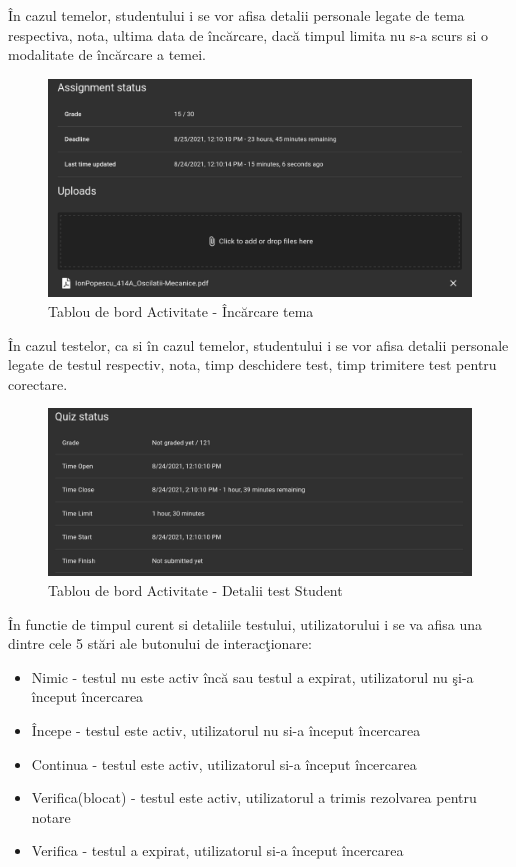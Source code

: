 \documentclass[12pt, a4paper, oneside, romanian]{teza-upb}
\begin{document}
În cazul temelor, studentului i se vor afisa detalii personale legate de tema respectiva, nota, ultima data de încărcare, dacă timpul limita nu s-a scurs si o modalitate de încărcare a temei.

\begin{figure}[H]
\centering
\includegraphics*[width=\columnwidth]{tablou-de-bord-activitate-incarcare-tema}
\caption{Tablou de bord Activitate - Încărcare tema}
\label{tablou-de-bord-activitate-incarcare-tema}
\end{figure}

În cazul testelor, ca si în cazul temelor, studentului i se vor afisa detalii personale legate de testul respectiv, nota, timp deschidere test, timp trimitere test pentru corectare.

\begin{figure}[H]
\centering
\includegraphics*[width=\columnwidth]{tablou-de-bord-activitate-detalii-test-student}
\caption{Tablou de bord Activitate - Detalii test Student}
\label{tablou-de-bord-activitate-detalii-test-student}
\end{figure}

În functie de timpul curent si detaliile testului, utilizatorului i se va afisa una dintre cele 5 stări ale butonului de interacţionare:
\begin{itemize}
	\item Nimic - testul nu este activ încă sau testul a expirat, utilizatorul nu şi-a început încercarea
	\item Începe - testul este activ, utilizatorul nu si-a început încercarea
	\item Continua - testul este activ, utilizatorul si-a început încercarea
	\item Verifica(blocat) - testul este activ, utilizatorul a trimis rezolvarea pentru notare
	\item Verifica - testul a expirat, utilizatorul si-a început încercarea
\end{itemize}
\end{document}
